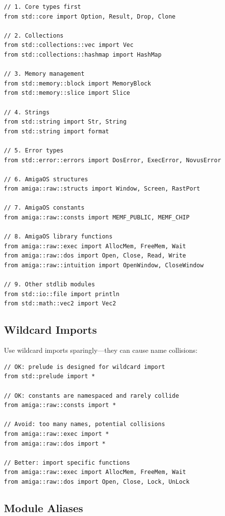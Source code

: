 \begin{lstlisting}
// 1. Core types first
from std::core import Option, Result, Drop, Clone

// 2. Collections
from std::collections::vec import Vec
from std::collections::hashmap import HashMap

// 3. Memory management
from std::memory::block import MemoryBlock
from std::memory::slice import Slice

// 4. Strings
from std::string import Str, String
from std::string import format

// 5. Error types
from std::error::errors import DosError, ExecError, NovusError

// 6. AmigaOS structures
from amiga::raw::structs import Window, Screen, RastPort

// 7. AmigaOS constants
from amiga::raw::consts import MEMF_PUBLIC, MEMF_CHIP

// 8. AmigaOS library functions
from amiga::raw::exec import AllocMem, FreeMem, Wait
from amiga::raw::dos import Open, Close, Read, Write
from amiga::raw::intuition import OpenWindow, CloseWindow

// 9. Other stdlib modules
from std::io::file import println
from std::math::vec2 import Vec2
\end{lstlisting}

\subsection{Wildcard Imports}

Use wildcard imports sparingly---they can cause name collisions:

\begin{lstlisting}
// OK: prelude is designed for wildcard import
from std::prelude import *

// OK: constants are namespaced and rarely collide
from amiga::raw::consts import *

// Avoid: too many names, potential collisions
from amiga::raw::exec import *
from amiga::raw::dos import *

// Better: import specific functions
from amiga::raw::exec import AllocMem, FreeMem, Wait
from amiga::raw::dos import Open, Close, Lock, UnLock
\end{lstlisting}

\subsection{Module Aliases}

